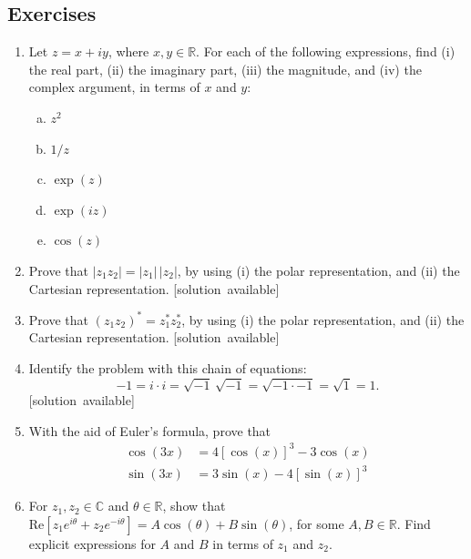 \documentclass[10pt,a4paper]{article}
\begin{document}
\subsection{Exercises}

\begin{enumerate}
\item
  Let $z = x + iy$, where $x, y \in \mathbb{R}$. For each of the
  following expressions, find (i) the real part, (ii) the imaginary
  part, (iii) the magnitude, and (iv) the complex argument, in terms of
  $x$ and $y$:

  \begin{enumerate}[(a)]
  \item $z^2$
  \item $1/z$
  \item $\exp(z)$
  \item $\exp(iz)$
  \item $\cos(z)$
  \end{enumerate}

\item
  Prove that $|z_1 z_2| = |z_1|\, |z_2|$, by using (i) the polar
  representation, and (ii) the Cartesian representation.
  \hfill{\scriptsize [solution~available]}

\item
  Prove that $(z_1 z_2)^* = z_1^* z_2^*$, by using (i) the polar
  representation, and (ii) the Cartesian representation.
  \hfill{\scriptsize [solution~available]}

\item
  Identify the problem with this chain of equations:
  \begin{equation*}
    -1 = i \cdot i =
    \sqrt{-1}\,\sqrt{-1} = \sqrt{-1 \cdot -1} = \sqrt{1} = 1. 
  \end{equation*}
  \vskip -0.19in
  \hfill{\scriptsize [solution~available]}

\item
  With the aid of Euler's formula, prove that
  \begin{align}
    \cos(3x) &= 4[\cos(x)]^3 -3\cos(x) \\
    \sin(3x) &= 3\sin(x)-4[\sin(x)]^3
  \end{align}

\item
  For $z_1, z_2 \in \mathbb{C}$ and $\theta \in \mathbb{R}$, show that
  $\mathrm{Re}\left[z_1 e^{i\theta} + z_2 e^{-i\theta}\right] = A
  \cos(\theta) + B \sin(\theta)$, for some $A, B \in \mathbb{R}$. Find
  explicit expressions for $A$ and $B$ in terms of $z_1$ and $z_2$.


\end{enumerate}
\end{document}
